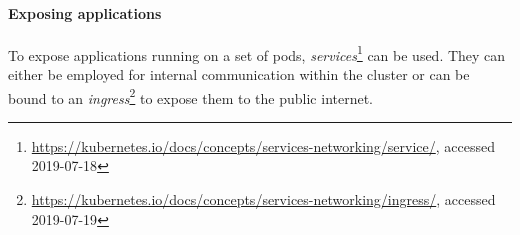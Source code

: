 \paragraph{Exposing applications}

To expose applications running on a set of pods, \textit{services}\footnote{\url{https://kubernetes.io/docs/concepts/services-networking/service/}, accessed 2019-07-18} can be used. They can either be employed for internal communication within the cluster or can be bound to an \textit{ingress}\footnote{\url{https://kubernetes.io/docs/concepts/services-networking/ingress/}, accessed 2019-07-19} to expose them to the public internet. 


